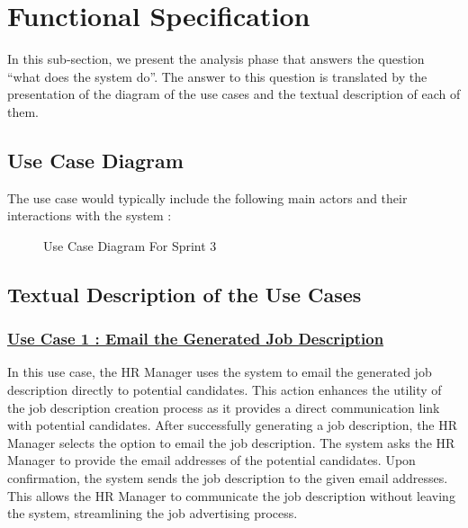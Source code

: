 \newpage
\section{Functional Specification}
In this sub-section, we present the analysis phase that answers the question “what does the system do”. The answer to this question is translated by the presentation of the diagram of the use cases and the textual description of each of them.

\subsection{Use Case Diagram}
The use case would typically include the following main actors and their interactions with the system :

\begin{figure}[H]
    \centering
    \caption{ Use Case Diagram For Sprint 3 }
    \label{fig:Sprint3_UseCaseDiagram}
\end{figure}

\subsection{Textual Description of the Use Cases}
\subsubsection{\underline{Use Case 1 : Email the Generated Job Description}}
In this use case, the HR Manager uses the system to email the generated job description directly to potential candidates. This action enhances the utility of the job description creation process as it provides a direct communication link with potential candidates. After successfully generating a job description, the HR Manager selects the option to email the job description. The system asks the HR Manager to provide the email addresses of the potential candidates. Upon confirmation, the system sends the job description to the given email addresses. This allows the HR Manager to communicate the job description without leaving the system, streamlining the job advertising process.

